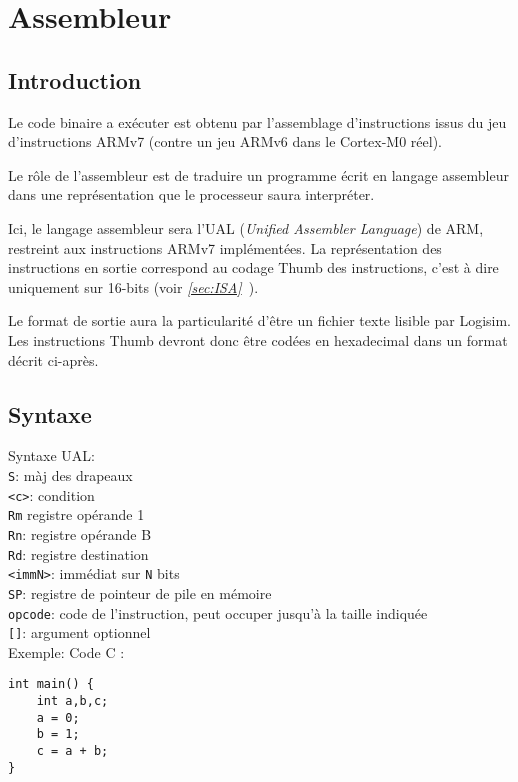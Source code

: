 \section{Assembleur}

\subsection{Introduction}

	Le code binaire a exécuter est obtenu par l'assemblage d'instructions issus du jeu d'instructions ARMv7 (contre un jeu ARMv6 dans le Cortex-M0 réel).

Le rôle de l'assembleur est de traduire un programme écrit en langage assembleur dans une représentation que le processeur saura interpréter.

Ici, le langage assembleur sera l'UAL (\textit{Unified Assembler Language}) de ARM, restreint aux instructions ARMv7 implémentées.
La représentation des instructions en sortie correspond au codage Thumb des instructions, c'est à dire uniquement sur 16-bits (voir \textit{\ref{sec:ISA}~}).

Le format de sortie aura la particularité d'être un fichier texte lisible par Logisim. Les instructions Thumb devront donc être codées en hexadecimal dans un format décrit ci-après.

\subsection{Syntaxe}
Syntaxe UAL:\\
\texttt{S}: màj des drapeaux\\
\texttt{<c>}: condition\\
\texttt{Rm} registre opérande 1\\
\texttt{Rn}: registre opérande B\\
\texttt{Rd}: registre destination\\
\texttt{<immN>}: immédiat sur \texttt{N} bits\\
\texttt{SP}: registre de pointeur de pile en mémoire\\
\texttt{opcode}: code de l'instruction, peut occuper jusqu'à la taille indiquée\\
\texttt{[]}: argument optionnel\\

Exemple:
Code C :
\lstset{language=C}
\begin{lstlisting}
int main() {
	int a,b,c;
	a = 0;
	b = 1;
	c = a + b;
}
\end{lstlisting}


